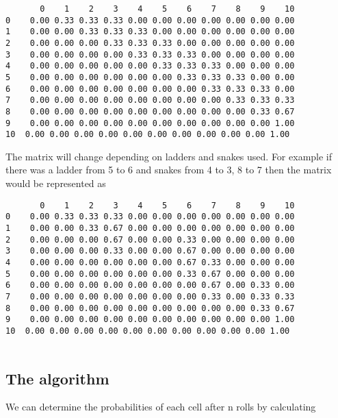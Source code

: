 \documentclass[11pt]{article}
\begin{document}
\begin{verbatim}
	   0    1    2    3    4    5    6    7    8    9    10 
0	 0.00 0.33 0.33 0.33 0.00 0.00 0.00 0.00 0.00 0.00 0.00 
1	 0.00 0.00 0.33 0.33 0.33 0.00 0.00 0.00 0.00 0.00 0.00 
2	 0.00 0.00 0.00 0.33 0.33 0.33 0.00 0.00 0.00 0.00 0.00 
3	 0.00 0.00 0.00 0.00 0.33 0.33 0.33 0.00 0.00 0.00 0.00 
4	 0.00 0.00 0.00 0.00 0.00 0.33 0.33 0.33 0.00 0.00 0.00 
5	 0.00 0.00 0.00 0.00 0.00 0.00 0.33 0.33 0.33 0.00 0.00 
6	 0.00 0.00 0.00 0.00 0.00 0.00 0.00 0.33 0.33 0.33 0.00 
7	 0.00 0.00 0.00 0.00 0.00 0.00 0.00 0.00 0.33 0.33 0.33 
8	 0.00 0.00 0.00 0.00 0.00 0.00 0.00 0.00 0.00 0.33 0.67 
9	 0.00 0.00 0.00 0.00 0.00 0.00 0.00 0.00 0.00 0.00 1.00 
10	0.00 0.00 0.00 0.00 0.00 0.00 0.00 0.00 0.00 0.00 1.00 

\end{verbatim}

The matrix will change depending on ladders and snakes used. For example if there was a ladder from 5 to 6 and snakes from 4 to 3, 8 to 7 then the matrix would be represented as
\begin{verbatim}
	   0    1    2    3    4    5    6    7    8    9    10 
0	 0.00 0.33 0.33 0.33 0.00 0.00 0.00 0.00 0.00 0.00 0.00 
1	 0.00 0.00 0.33 0.67 0.00 0.00 0.00 0.00 0.00 0.00 0.00 
2	 0.00 0.00 0.00 0.67 0.00 0.00 0.33 0.00 0.00 0.00 0.00 
3	 0.00 0.00 0.00 0.33 0.00 0.00 0.67 0.00 0.00 0.00 0.00 
4	 0.00 0.00 0.00 0.00 0.00 0.00 0.67 0.33 0.00 0.00 0.00 
5	 0.00 0.00 0.00 0.00 0.00 0.00 0.33 0.67 0.00 0.00 0.00 
6	 0.00 0.00 0.00 0.00 0.00 0.00 0.00 0.67 0.00 0.33 0.00 
7	 0.00 0.00 0.00 0.00 0.00 0.00 0.00 0.33 0.00 0.33 0.33 
8	 0.00 0.00 0.00 0.00 0.00 0.00 0.00 0.00 0.00 0.33 0.67 
9	 0.00 0.00 0.00 0.00 0.00 0.00 0.00 0.00 0.00 0.00 1.00 
10	0.00 0.00 0.00 0.00 0.00 0.00 0.00 0.00 0.00 0.00 1.00 


\end{verbatim}

\subsection{The algorithm}
We can determine the probabilities of each cell after n rolls by calculating
\end{document}
